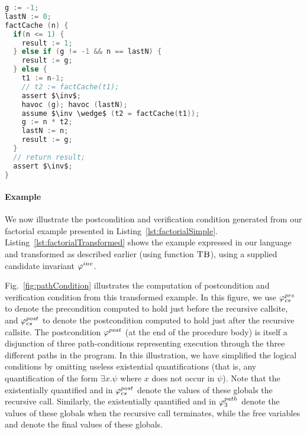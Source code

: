 
\begin{lstlisting}[float,language=c,mathescape=true,basicstyle=\scriptsize,caption= {Procedure factCache from
      Listing~\ref{lst:factorialSimple} transformed to incorporate a supplied candidate
      invariant $\inv$.}, label=lst:factorialTransformed]
g := -1;
lastN := 0;
factCache (n) {
  if(n <= 1) {
    result := 1;
  } else if (g != -1 && n == lastN) {
    result := g;
  } else {
    t1 := n-1;
    // t2 := factCache(t1);
    assert $\inv$;
    havoc (g); havoc (lastN);
    assume $\inv \wedge$ (t2 = factCache(t1));
    g := n * t2;
    lastN := n;
    result := g;
  }
  // return result;
  assert $\inv$;
}
\end{lstlisting}

\paragraph{Example}
We now illustrate the postcondition and verification condition generated from our factorial example
presented in Listing~\ref{lst:factorialSimple}. Listing~\ref{lst:factorialTransformed} shows the example
expressed in our language and transformed as described earlier (using function $\textsc{TB}$), using a
supplied candidate invariant $\varphi^{inv}$.

Fig.~\ref{fig:pathCondition} illustrates the computation of postcondition and verification condition from
this transformed example. In this figure, we use $\varphi^{pre}_{cs}$ to denote the precondition computed to hold
just before the recursive callsite, and $\varphi^{post}_{cs}$ to denote the postcondition computed to hold just
after the recursive callsite. The postcondition $\varphi^{post}$ (at the end of the procedure body) is itself
a disjunction of three path-conditions representing execution through the three different paths in
the program. In this illustration, we have simplified the logical conditions by omitting useless existential
quantifications (that is, any quantification of the form $\exists x. \psi$ where $x$ does not occur in $\psi$).
Note that the existentially quantified  and  in $\varphi^{post}_{cs}$ denote the values of these
globals  the recursive call. Similarly, the existentially quantified  and  in
$\varphi^{path}_3$ denote the values of these globals when the recursive call terminates, while the free variables
 and  denote the final values of these globals.

